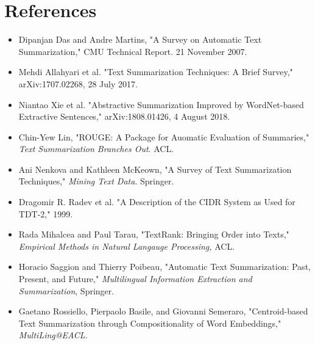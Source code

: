 \documentclass[11pt]{article}
\begin{document}
\section{References}
\label{sec:org02cb1a3}
\begin{itemize}
\item\relax [1] Dipanjan Das and Andre Martins, "A Survey on Automatic Text Summarization," CMU Technical Report. 21 November 2007.
\item\relax [2] Mehdi Allahyari et al. "Text Summarization Techniques: A Brief Survey," arXiv:1707.02268, 28 July 2017.
\item\relax [3] Niantao Xie et al. "Abstractive Summarization Improved by WordNet-based Extractive Sentences," arXiv:1808.01426, 4 August 2018.
\item\relax [4] Chin-Yew Lin, "ROUGE: A Package for Auomatic Evaluation of Summaries," \emph{Text Summarization Branches Out}. ACL.
\item\relax [5] Ani Nenkova and Kathleen McKeown, "A Survey of Text Summarization Techniques," \emph{Mining Text Data}. Springer.
\item\relax [6] Dragomir R. Radev et al. "A Description of the CIDR System as Used for TDT-2," 1999.
\item\relax [7] Rada Mihalcea and Paul Tarau, "TextRank: Bringing Order into Texts," \emph{Empirical Methods in Natural Langauge Processing,} ACL.
\item\relax [8] Horacio Saggion and Thierry Poibeau, "Automatic Text Summarization: Past, Present, and Future," \emph{Multilingual Information Extraction and Summarization}, Springer.
\item\relax [9] Gaetano Rossiello, Pierpaolo Basile, and Giovanni Semeraro, "Centroid-based Text Summarization through Compositionality of Word Embeddings," \emph{MultiLing@EACL.}
\end{itemize}
\end{document}
